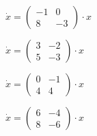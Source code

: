 \begin{multicols}{3}
\begin{enumtasks}
			\label{linsys_hmg:transformation_mtxs}
			\item \( \dot{x} = \begin{pmatrix} -1 & 0 \\ 8 & -3 \end{pmatrix} \cdot x \) %
			\item \( \dot{x} = \begin{pmatrix} 3 & -2 \\ 5 & -3 \end{pmatrix} \cdot x \) %
			\item \( \dot{x} = \begin{pmatrix} 0 & -1 \\ 4 & 4 \end{pmatrix} \cdot x \) %
			\item \( \dot{x} = \begin{pmatrix} 6 & -4 \\ 8 & -6 \end{pmatrix} \cdot x \) %

\end{enumtasks}
\end{multicols}
